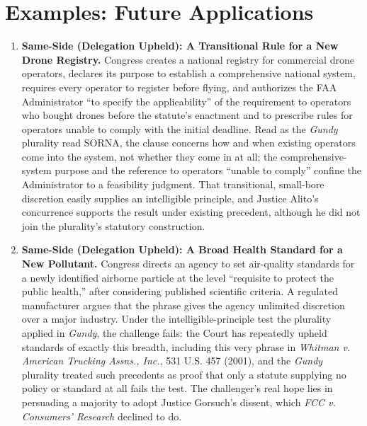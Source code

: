 \documentclass[12pt]{article}
\begin{document}
\section{Examples: Future Applications}
\begin{enumerate}

\item \textbf{Same-Side (Delegation Upheld): A Transitional Rule for a New Drone Registry.} Congress creates a national registry for commercial drone operators, declares its purpose to establish a comprehensive national system, requires every operator to register before flying, and authorizes the FAA Administrator ``to specify the applicability'' of the requirement to operators who bought drones before the statute's enactment and to prescribe rules for operators unable to comply with the initial deadline. Read as the \textit{Gundy} plurality read SORNA, the clause concerns how and when existing operators come into the system, not whether they come in at all; the comprehensive-system purpose and the reference to operators ``unable to comply'' confine the Administrator to a feasibility judgment. That transitional, small-bore discretion easily supplies an intelligible principle, and Justice Alito's concurrence supports the result under existing precedent, although he did not join the plurality's statutory construction.

\item \textbf{Same-Side (Delegation Upheld): A Broad Health Standard for a New Pollutant.} Congress directs an agency to set air-quality standards for a newly identified airborne particle at the level ``requisite to protect the public health,'' after considering published scientific criteria. A regulated manufacturer argues that the phrase gives the agency unlimited discretion over a major industry. Under the intelligible-principle test the plurality applied in \textit{Gundy}, the challenge fails: the Court has repeatedly upheld standards of exactly this breadth, including this very phrase in \textit{Whitman v. American Trucking Assns., Inc.}, 531 U.S. 457 (2001), and the \textit{Gundy} plurality treated such precedents as proof that only a statute supplying no policy or standard at all fails the test. The challenger's real hope lies in persuading a majority to adopt Justice Gorsuch's dissent, which \textit{FCC v. Consumers' Research} declined to do.


\end{enumerate}
\end{document}
